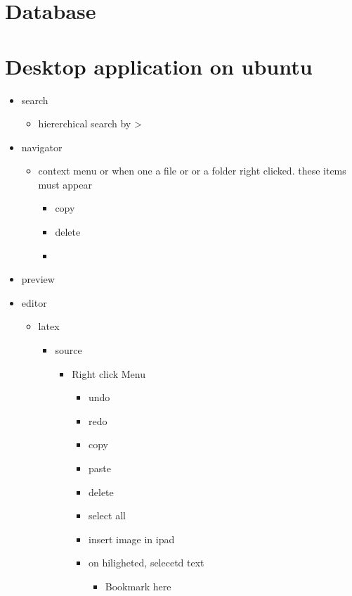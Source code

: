 \documentclass[a4paper]{article}
\title{}
\date{}
\author{Mohammad Rahmani}
\begin{document}
   \maketitle
   \section{Database}
   \section{Desktop application on ubuntu}
      \begin{itemize}
         \item search
         \begin{itemize}
            \item hiererchical search by >
         \end{itemize}
         \item navigator
         \begin{itemize}
            \item  context menu or when one a file or or a folder right clicked. these items must appear
            \begin{itemize}
               \item copy
               \item delete
               \item
            \end{itemize}
         \end{itemize}
         \item preview
         \item editor
         \begin{itemize}
            \item latex
            \begin{itemize}
               \item source
               \begin{itemize}
                  \item Right click Menu
                  \begin{itemize}
                     \item undo
                     \item redo
                     \item copy
                     \item paste
                     \item delete
                     \item select all
                     \item insert image in ipad
                     \item on hiligheted, selecetd text
                     \begin{itemize}
                        \item Bookmark here
                     \end{itemize}
                  \end{itemize}


\end{itemize}
\end{itemize}
\end{itemize}
\end{itemize}
\end{document}
